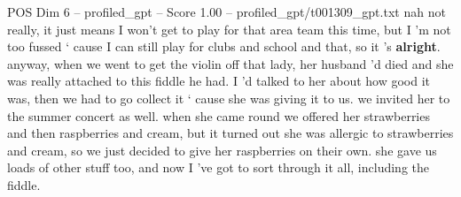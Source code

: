 \begin{textsample}{POS Dim 6 – profiled\_gpt – Score 1.00 – profiled\_gpt/t001309\_gpt.txt}  \label{ex:f6_pos_032}
nah not really, it just means I won't get to play for that area team this time, but I ’m not too fussed ‘ cause I can still play for clubs and school and that, so it ’s \textbf{alright}. anyway, when we went to get the violin off that lady, her husband ’d died and she was really attached to this fiddle he had.
I ’d talked to her about how good it was, then we had to go collect it ‘ cause she was giving it to us. we invited her to the summer concert as well. when she came round we offered her strawberries and then raspberries and cream, but it turned out she was allergic to strawberries and cream, so we just decided to give her raspberries on their own. she gave us loads of other stuff too, and now I ’ve got to sort through it all, including the fiddle.

\end{textsample}
